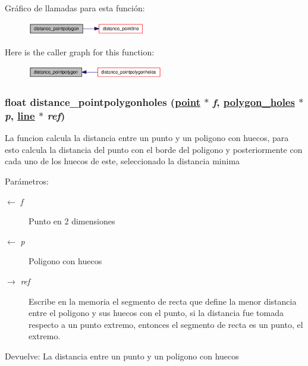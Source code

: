 Gr\'{a}fico de llamadas para esta funci\'{o}n:\begin{figure}[H]
\begin{center}
\leavevmode
\includegraphics[width=146pt]{group__distance_g25716e8d1c8abaf08903bbcd08b8d6e5_g25716e8d1c8abaf08903bbcd08b8d6e5_cgraph}
\end{center}
\end{figure}


Here is the caller graph for this function:\begin{figure}[H]
\begin{center}
\leavevmode
\includegraphics[width=168pt]{group__distance_g25716e8d1c8abaf08903bbcd08b8d6e5_g25716e8d1c8abaf08903bbcd08b8d6e5_icgraph}
\end{center}
\end{figure}
\hypertarget{group__distance_gc837f0084791f42936ade857a0cce3af_gc837f0084791f42936ade857a0cce3af}{
\subsubsection[distance\_\-pointpolygonholes]{\setlength{\rightskip}{0pt plus 5cm}float distance\_\-pointpolygonholes (\hyperlink{struct__point}{point} $\ast$ {\em f}, \hyperlink{struct__polygon__holes}{polygon\_\-holes} $\ast$ {\em p}, \hyperlink{struct__line}{line} $\ast$ {\em ref})}}
\label{group__distance_gc837f0084791f42936ade857a0cce3af_gc837f0084791f42936ade857a0cce3af}


La funcion calcula la distancia entre un punto y un poligono con huecos, para esto calcula la distancia del punto con el borde del poligono y posteriormente con cada uno de los huecos de este, seleccionado la distancia minima \begin{Desc}
\item[Par\'{a}metros:]
\begin{description}
\item[\mbox{$\leftarrow$} {\em f}]Punto en 2 dimensiones \item[\mbox{$\leftarrow$} {\em p}]Poligono con huecos \item[\mbox{$\rightarrow$} {\em ref}]Escribe en la memoria el segmento de recta que define la menor distancia entre el poligono y sus huecos con el punto, si la distancia fue tomada respecto a un punto extremo, entonces el segmento de recta es un punto, el extremo. \end{description}
\end{Desc}
\begin{Desc}
\item[Devuelve:]La distancia entre un punto y un poligono con huecos \end{Desc}



